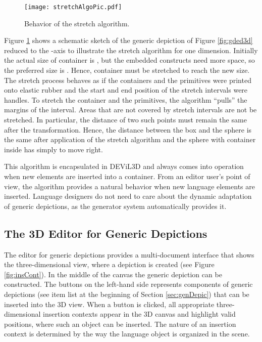 \documentclass[a4paper]{article}
\newcommand{\dev}{DEViL3D\xspace}
\begin{document}
\begin{figure}[!ht]
  \centering
  \texttt{[image: stretchAlgoPic.pdf]}
  \caption{Behavior of the stretch algorithm.}
  \label{fig:stretchAlgoPic}
\end{figure}

Figure \ref{fig:stretchAlgoPic} shows a schematic sketch of the generic depiction of Figure \ref{fig:gded3d} reduced to the -axis to illustrate the stretch algorithm for one dimension. Initially the actual size of container  is , but the embedded constructs need more space, so the preferred size is . Hence, container  must be stretched to reach the new size. The stretch process behaves as if the containers and the primitives were printed onto elastic rubber and the start and end position of the stretch intervals were handles. To stretch the container and the primitives, the algorithm ``pulls'' the margins of the interval. Areas that are not covered by stretch intervals are not be stretched. In particular, the distance of two such points must remain the same after the transformation. Hence, the distance  between the box and the sphere is the same after application of the stretch algorithm and the sphere with container  inside has simply to move right.

This algorithm is encapsulated in \dev and always comes into operation when new elements are inserted into a container. From an editor user's point of view, the algorithm provides a natural behavior when new language elements are inserted. Language designers do not need to care about the dynamic adaptation of generic depictions, as the generator system automatically provides it.

\subsection{The 3D Editor for Generic Depictions}
\label{subsec:genDepicEditor}
The editor for generic depictions provides a multi-document interface that shows the three-dimensional view, where a depiction is created (see Figure \ref{fig:insCont}). In the middle of the canvas the generic depiction can be constructed. The buttons on the left-hand side represents components of generic depictions (see item list at the beginning of Section \ref{sec:genDepic}) that can be inserted into the 3D view. When a button is clicked, all appropriate three-dimensional insertion contexts appear in the 3D canvas and highlight valid positions, where such an object can be inserted. The nature of an insertion context is determined by the way the language object is organized in the scene.
\end{document}
